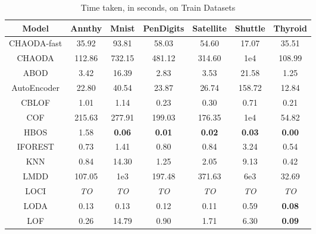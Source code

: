 \begin{table}[!t]
\renewcommand{\arraystretch}{1.25}
\caption{Time taken, in seconds, on Train Datasets}
\label{supplement:table:results:train-time}
\centering
\begin{tabular}{|c|c|c|c|c|c|c|}
\hline
\textbf{Model} & \textbf{Annthy} & \textbf{Mnist} & \textbf{PenDigits} & \textbf{Satellite} & \textbf{Shuttle} & \textbf{Thyroid} \\
\hline
CHAODA-fast    & 35.92           & 93.81          & 58.03              & 54.60              & 17.07            & 35.51           \\
\hline
CHAODA         & 112.86          & 732.15         & 481.12             & 314.60             & 1e4              & 108.99           \\
\hline
ABOD &                3.42 &          16.39 &               2.83 &               3.53 &            21.58 &             1.25 \\
\hline
AutoEncoder &               22.80 &          40.54 &              23.87 &              26.74 &           158.72 &            12.84 \\
\hline
CBLOF &                1.01 &           1.14 &               0.23 &               0.30 &             0.71 &             0.21 \\
\hline
COF &              215.63 &         277.91 &             199.03 &             176.35 &         1e4 &            54.82 \\
\hline
HBOS &                1.58 &  \textbf{0.06} &      \textbf{0.01} &      \textbf{0.02} &    \textbf{0.03} &    \textbf{0.00} \\
\hline
IFOREST &                0.73 &           1.41 &               0.80 &               0.84 &             3.24 &             0.54 \\
\hline
KNN &                0.84 &          14.30 &               1.25 &               2.05 &             9.13 &             0.42 \\
\hline
LMDD &              107.05 &        1e3 &             197.48 &             371.63 &          6e3 &            32.69 \\
\hline
LOCI &         \textit{TO} &    \textit{TO} &        \textit{TO} &        \textit{TO} &      \textit{TO} &      \textit{TO} \\
\hline
LODA &                0.13 &           0.13 &               0.12 &               0.11 &             0.59 &    \textbf{0.08} \\
\hline
LOF &                0.26 &          14.79 &               0.90 &               1.71 &             6.30 &    \textbf{0.09} \\

\end{tabular}
\end{table}
